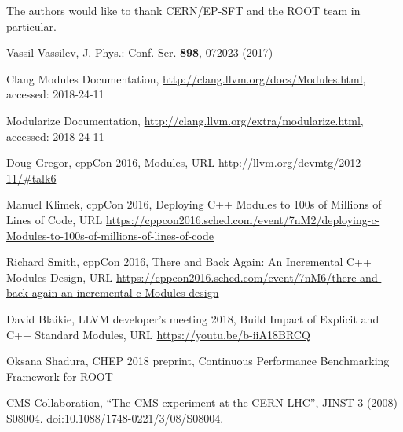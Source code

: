 \documentclass{webofc}
\begin{document}
The authors would like to thank CERN/EP-SFT and the ROOT team in particular.

\begin{thebibliography}{plain}

Vassil Vassilev, J. Phys.: Conf. Ser. \textbf{898}, 072023 (2017)

Clang Modules Documentation, \url{http://clang.llvm.org/docs/Modules.html}, accessed: 2018-24-11

Modularize Documentation, \url{http://clang.llvm.org/extra/modularize.html}, accessed: 2018-24-11

Doug Gregor, cppCon 2016, Modules, URL \url{http://llvm.org/devmtg/2012-11/#talk6}

Manuel Klimek, cppCon 2016, Deploying C++ Modules to 100s of Millions of Lines of Code, URL \url{https://cppcon2016.sched.com/event/7nM2/deploying-c-Modules-to-100s-of-millions-of-lines-of-code}

Richard Smith, cppCon 2016, There and Back Again: An Incremental C++ Modules Design, URL \url{https://cppcon2016.sched.com/event/7nM6/there-and-back-again-an-incremental-c-Modules-design}

David Blaikie, LLVM developer's meeting 2018, Build Impact of Explicit and C++ Standard Modules, URL \url{https://youtu.be/b-iiA18BRCQ}

Oksana Shadura, CHEP 2018 preprint, Continuous Performance Benchmarking Framework for ROOT

CMS Collaboration, “The CMS experiment at the CERN LHC”, JINST 3 (2008) S08004. doi:10.1088/1748-0221/3/08/S08004.

\end{thebibliography}
\end{document}
